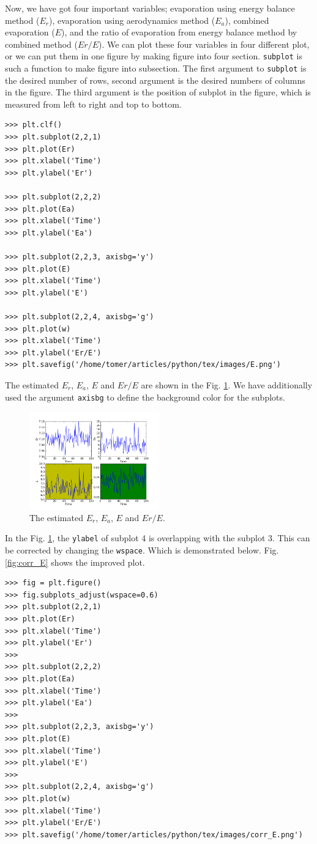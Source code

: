 \documentclass[10pt]{book}
\begin{document}
{
Now, we have got four important variables; evaporation using energy balance method ($E_r$), evaporation using aerodynamics method ($E_a$), combined evaporation ($E$), and the ratio of evaporation from energy balance method by combined method ($Er/E$). We can plot these four variables in four different plot, or we can put them in one figure by making figure into four section. \verb"subplot" is such a function to make figure into subsection. The first argument to \verb"subplot" is the desired number of rows, second argument is the desired numbers of columns in the figure. The third argument is the position of subplot in the figure, which is measured from left to right and top to bottom. 
\beforeverb \begin{verbatim}
>>> plt.clf()
>>> plt.subplot(2,2,1)
>>> plt.plot(Er)
>>> plt.xlabel('Time')
>>> plt.ylabel('Er')

>>> plt.subplot(2,2,2)
>>> plt.plot(Ea)
>>> plt.xlabel('Time')
>>> plt.ylabel('Ea')

>>> plt.subplot(2,2,3, axisbg='y')
>>> plt.plot(E)
>>> plt.xlabel('Time')
>>> plt.ylabel('E')

>>> plt.subplot(2,2,4, axisbg='g')
>>> plt.plot(w)
>>> plt.xlabel('Time')
>>> plt.ylabel('Er/E')
>>> plt.savefig('/home/tomer/articles/python/tex/images/E.png')
\end{verbatim} \afterverb

The estimated $E_r$, $E_a$, $E$ and $Er/E$ are shown in the Fig. \ref{fig:E}. We have additionally used the argument \verb"axisbg" to define the background color for the subplots. 
\beforefig
\begin{figure}[h!]
  \centering
    \includegraphics[width=0.5\textwidth]{images/E.png}
  \caption{The estimated $E_r$, $E_a$, $E$ and $Er/E$.}
   \label{fig:E}
\end{figure}
\afterfig

In the Fig. \ref{fig:E}, the \verb"ylabel" of subplot 4 is overlapping with the subplot 3. This can be corrected by changing the \verb"wspace". Which is demonstrated below. Fig. \ref{fig:corr_E} shows the improved plot.
\beforeverb
\begin{verbatim}
>>> fig = plt.figure()
>>> fig.subplots_adjust(wspace=0.6)
>>> plt.subplot(2,2,1)
>>> plt.plot(Er)
>>> plt.xlabel('Time')
>>> plt.ylabel('Er')
>>> 
>>> plt.subplot(2,2,2)
>>> plt.plot(Ea)
>>> plt.xlabel('Time')
>>> plt.ylabel('Ea')
>>> 
>>> plt.subplot(2,2,3, axisbg='y')
>>> plt.plot(E)
>>> plt.xlabel('Time')
>>> plt.ylabel('E')
>>> 
>>> plt.subplot(2,2,4, axisbg='g')
>>> plt.plot(w)
>>> plt.xlabel('Time')
>>> plt.ylabel('Er/E')
>>> plt.savefig('/home/tomer/articles/python/tex/images/corr_E.png')
\end{verbatim}
\afterverb

}
\end{document}
